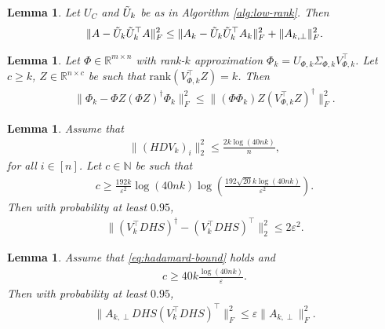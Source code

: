 \documentclass[13pt]{article}
\newtheorem{lem}[thm]{Lemma}
\theoremstyle{plain}
\newcommand{\R}{\mathbb{R}}
\newcommand{\N}{\mathbb{N}}
\newcommand{\rank}{\mathrm{rank}}
\newcommand{\til}{\ensuremath{\tilde}}
\begin{document}
\begin{lem}
    Let $U_C$ and $\til{U}_k$ be as in Algorithm \ref{alg:low-rank}.
    Then
    \[
        \begin{aligned}
            \|A - \til{U}_k\til{U}_k^\top A\|_F^2 \le \|A_k - \til{U}_k\til{U}_k^\top A_k\|_F^2 + \|A_{k, \perp}\|_F^2.
        \end{aligned}
    \]
\end{lem}

\begin{lem}
    Let $\Phi \in \R^{m \times n}$ with rank-$k$ approximation $\Phi_{k} = U_{\Phi, k} \Sigma_{\Phi, k} V^{\top}_{\Phi, k}$.
    Let $c \ge k$, $Z \in \R^{n \times c}$ be such that $\rank(V^\top_{\Phi, k}  Z) = k$.
    Then
    \[
        \begin{aligned}
            \|\Phi_{k} - \Phi Z (\Phi Z)^\dagger\Phi_k\|_F^2 \le \|(\Phi\Phi_k)Z(V^\top_{\Phi, k}Z)^\dagger\|_F^2.
        \end{aligned}
    \]
\end{lem}

\begin{lem}
    Assume that
    \begin{align*} \label{eq:hadamard-bound}
        \|(HDV_k)_i\|_2^2 \le \frac{2k\log(40nk)}{n}, \tag{$\ast$}
    \end{align*}
    for all $i \in [n]$.
    Let $c \in \N$ be such that
    \[
        \begin{aligned}
            c \ge \frac{192k}{\varepsilon^2} \log(40nk)\log\left( \frac{192\sqrt{20} k \log(40nk)}{\varepsilon^2} \right).
        \end{aligned}
    \]
    Then with probability at least $0.95$,
    \[
        \begin{aligned}
            \|(V_k^\top DHS)^\dagger - (V_k^\top DHS)^\top\|_2^2 \le 2 \varepsilon^2.
        \end{aligned}
    \]
\end{lem}

\begin{lem}
    Assume that \eqref{eq:hadamard-bound} holds and
    \[
        \begin{aligned}
            c \ge 40k \frac{\log(40nk)}{\varepsilon}.
        \end{aligned}
    \]
    Then with probability at least $0.95$,
    \[
        \begin{aligned}
            \|A_{k, \perp}DHS (V_k^\top DHS)^\top\|_F^2 \le \varepsilon \|A_{k, \perp}\|_F^2.
        \end{aligned}
    \]
\end{lem}
\end{document}
